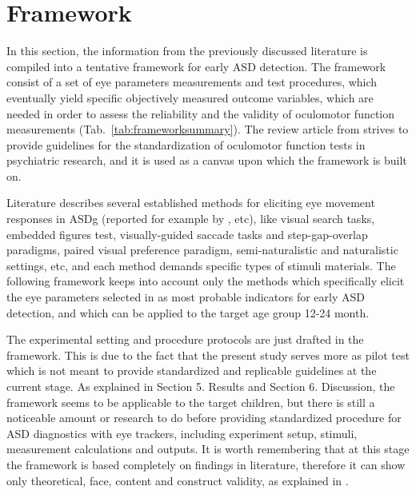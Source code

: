 \chapter{Framework}
\label{chap:framework}

In this section, the information from the previously discussed literature is compiled into a tentative framework for early ASD detection. The framework consist of a set of eye parameters measurements and test procedures, which eventually yield specific objectively measured outcome variables, which are needed in order to assess the reliability and the validity of oculomotor function measurements (Tab.~\ref{tab:frameworksummary}). The review article from \cite{smyrnis2008guidelines} strives to provide guidelines for the standardization of oculomotor function tests in psychiatric research, and it is used as a canvas upon which the framework is built on. 

Literature describes several established methods for eliciting eye movement responses in ASDg (reported for example by \citealp{johnson2016review,brenner2007visualsearch,zalla2016saccades,falck-ytter2013eyetrackingASD,papagiannopoulou2014review}, etc), like visual search tasks, embedded figures test, visually-guided saccade tasks and step-gap-overlap paradigms, paired visual preference paradigm, semi-naturalistic and naturalistic settings, etc, and each method demands specific types of stimuli materials. The following framework keeps into account only the methods which specifically elicit the eye parameters selected in  as most probable indicators for early ASD detection, and which can be applied to the target age group 12-24 month.

The experimental setting and procedure protocols are just drafted in the framework. This is due to the fact that the present study serves more as pilot test which is not meant to provide standardized and replicable guidelines at the current stage. As explained in Section 5. Results and Section 6. Discussion, the framework seems to be applicable to the target children, but there is still a noticeable amount or research to do before providing standardized procedure for ASD diagnostics with eye trackers, including experiment setup, stimuli, measurement calculations and outputs.
It is worth remembering that at this stage the framework is based completely on findings in literature, therefore it can show only theoretical, face, content and construct validity, as explained in .

